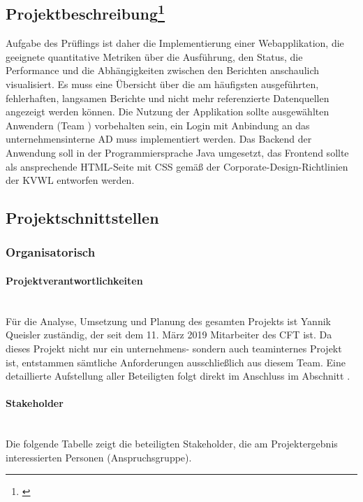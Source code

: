 \subsection[Projektbeschreibung]{Projektbeschreibung\footnote{\cite{Projektantrag}}}\label{sec:Projektbeschreibung}
\begin{displayquote}
	Aufgabe des Prüflings \autorName\xspace ist daher die Implementierung einer Webapplikation, die geeignete quantitative Metriken über die Ausführung, den Status, die Performance und die Abhängigkeiten zwischen den Berichten anschaulich visualisiert. Es muss eine Übersicht über die am häufigsten ausgeführten, fehlerhaften, langsamen Berichte und nicht mehr referenzierte Datenquellen angezeigt werden können. Die Nutzung der Applikation sollte ausgewählten Anwendern (Team \teamName) vorbehalten sein, \dahe ein Login mit Anbindung an das unternehmensinterne \ac{AD} muss implementiert werden. Das Backend der Anwendung soll in der Programmiersprache Java umgesetzt, das Frontend sollte als ansprechende HTML-Seite mit CSS gemäß der Corporate-Design-Richtlinien der \ac{KVWL} entworfen werden.
\end{displayquote}

\subsection{Projektschnittstellen}\label{sec:Projektschnittstellen}

\subsubsection{Organisatorisch}\label{sec:Projektschnittstellen:Organisatorisch}

\paragraph{Projektverantwortlichkeiten}~\\\label{p:Projektverantwortlichkeiten}
Für die Analyse, Umsetzung und Planung des gesamten Projekts ist Yannik Queisler zuständig, der seit dem 11. März 2019 Mitarbeiter des \ac{CFT} \teamName ist. Da dieses Projekt nicht nur ein unternehmens- sondern auch teaminternes Projekt ist, entstammen sämtliche Anforderungen ausschließlich aus diesem Team. Eine detaillierte Aufstellung aller Beteiligten folgt direkt im Anschluss im Abschnitt .

\paragraph{Stakeholder}~\\\label{p:Stakeholder}
Die folgende Tabelle zeigt die beteiligten Stakeholder, \dahe die am Projektergebnis interessierten Personen (Anspruchsgruppe).

